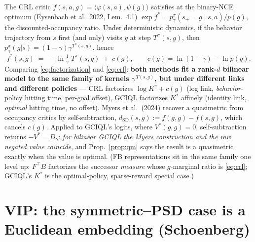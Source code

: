 \documentclass[10pt]{article}
\newcommand{\ip}[2]{\langle #1, #2 \rangle}
\begin{document}
The CRL critic $f(s,a,g)=\ip{\varphi(s,a)}{\psi(g)}$ satisfies at the binary-NCE optimum (Eysenbach et al.\ 2022, Lem.~4.1) $\exp f^* = p^{\pi}_\gamma(s_+{=}g \mid s,a)/p(g)$, the discounted-occupancy ratio. Under deterministic dynamics, if the behavior trajectory from $s$ first (and only) visits $g$ at step $T^{\pi}(s,g)$, then $p^{\pi}_\gamma(g|s) = (1-\gamma)\gamma^{T^{\pi}(s,g)}$, hence
\begin{equation}
f^*(s,g) \;=\; -\ln\!\tfrac{1}{\gamma}\; T^{\pi}(s,g) \;+\; c(g), \qquad c(g) = \ln(1-\gamma) - \ln p(g).
\label{eq:crl}
\end{equation}
Comparing \eqref{eq:factorization} and \eqref{eq:crl}: \textbf{both methods fit a rank-$d$ bilinear model to the same family of kernels $\gamma^{\,T(s,g)}$, but under different links and different policies} --- CRL factorizes $\log K^{\pi} + c(g)$ (log link, \emph{behavior}-policy hitting time, per-goal offset), GCIQL factorizes $K^*$ affinely (identity link, \emph{optimal} hitting time, no offset). Myers et al.\ (2024) recover a quasimetric from occupancy critics by self-subtraction, $d_{\mathrm{SD}}(s,g) := f(g,g)-f(s,g)$, which cancels $c(g)$. Applied to GCIQL's logits, where $V^*(g,g)=0$, self-subtraction returns $-V^* = D_\gamma$: \emph{for bilinear GCIQL the Myers construction and the raw negated value coincide}, and Prop.~\ref{prop:qm} says the result is a quasimetric exactly when the value is optimal. (FB representations sit in the same family one level up: $F^\top B$ factorizes the successor \emph{measure} whose $g$-marginal ratio is \eqref{eq:crl}; GCIQL's $K^*$ is the optimal-policy, sparse-reward special case.)

\section{VIP: the symmetric--PSD case is a Euclidean embedding (Schoenberg)}
\end{document}

